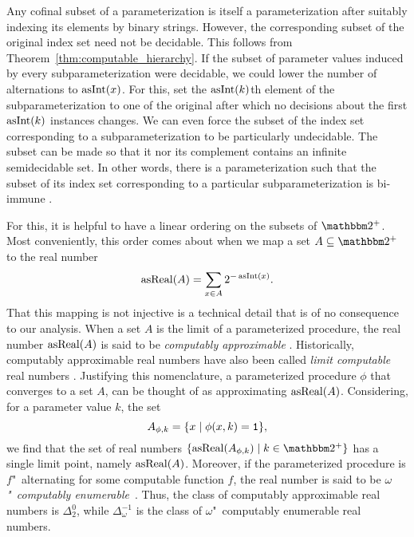 Any cofinal subset of a parameterization is itself a parameterization after suitably indexing its elements by binary strings.
However, the corresponding subset of the original index set need not be decidable.
This follows from Theorem~\ref{thm:computable_hierarchy}.
If the subset of parameter values induced by every subparameterization were decidable, we could lower the number of alternations to $\operatorname{asInt}(x)$.
For this, set the $\operatorname{asInt}(k)$th element of the subparameterization to one of the original after which no decisions about the first $\operatorname{asInt}(k)$ instances changes.
We can even force the subset of the index set corresponding to a subparameterization to be particularly undecidable.
The subset can be made so that it nor its complement contains an infinite semidecidable set.
In other words, there is a parameterization such that the subset of its index set corresponding to a particular subparameterization is bi-immune \parencite{rogers1967theory,odifreddi1992classical}.

For this, it is helpful to have a linear ordering on the subsets of $\binary^+$.
Most conveniently, this order comes about when we map a set $A \subseteq \binary^+$ to the real number
\begin{equation*}
  \operatorname{asReal}(A) = \sum_{x \in A} 2^{-\operatorname{asInt}(x)}.
\end{equation*}
That this mapping is not injective is a technical detail that is of no consequence to our analysis.
When a set $A$ is the limit of a parameterized procedure, the real number $\operatorname{asReal}(A)$ is said to be \emph{computably approximable} \parencite{ambos-spies2000weakly}.
Historically, computably approximable real numbers have also been called \emph{limit computable} real numbers \parencite{gold1965limiting}.
Justifying this nomenclature, a parameterized procedure $\phi$ that converges to a set $A$, can be thought of as approximating $\operatorname{asReal}(A)$.
Considering, for a parameter value $k$, the set
\begin{equation*}
  A_{\phi, k} = \{x \;|\; \phi(x, k) = \textnormal{\texttt{1}}\},
\end{equation*}
we find that the set of real numbers $\{\asReal(A_{\phi, k}) \st k \in \binary^+\}$ has a single limit point, namely $\operatorname{asReal}(A)$.
Moreover, if the parameterized procedure is $f$"~alternating for some computable function $f$, the real number is said to be \emph{$\omega$"~computably enumerable}~\parencite{ambos-spies2000weakly}.
Thus, the class of computably approximable real numbers is $\Delta^0_2$, while $\Delta^{-1}_\omega$ is the class of $\omega$"~computably enumerable real numbers.

